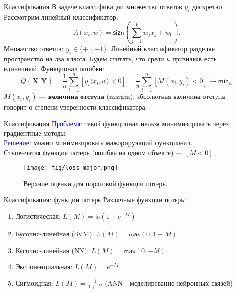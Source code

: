 \documentclass[handout]{beamer}
\begin{document}
\begin{frame}{Классификация}
	В задаче классификации множество ответов $y_i$ дискретно.\\
	Рассмотрим линейный классификатор: 
	\begin{equation}
		A(x_i,w)=\mathsf{sign}(\sum_{j=1}^kw_jx_j + w_0).
	\end{equation}
	Множество ответов: $y_i \in \{+1, -1\}$. Линейный классификатор разделяет пространство на два класса. Будем считать, что среди $k$ признаков есть единичный.
	Функционал ошибки:
	\begin{equation}
		Q(\mathbf{X}, \mathbf{Y}) = \frac{1}{n}\sum_{i=1}^{n}[y_i\langle x_i, w\rangle < 0]=\frac{1}{n}\sum_{i=1}^{n}[M(x_i, y_i) < 0] \rightarrow \mathsf{min}_{w}
	\end{equation}
	$M(x_i, y_i)$ --- \textbf{величина отступа} (margin), абсолютная величина отступа говорит о степени уверенности классификатора. 
\end{frame}

\begin{frame}{Классификация}
	\small
	\textcolor{blue}{Проблема}: такой функционал нельзя минимизировать через градиентные методы.\\
	\textcolor{blue}{Решение}: можно минимизировать мажорирующий функционал.\\
	Ступенчатая функция потерь (ошибка на одном объекте) --- $[M < 0]$.
	\begin{figure}
	    \texttt{[image: fig/loss\_major.png]}
	    \caption{\small Верхние оценки для пороговой функции потерь.
	    } 
	    \label{fig:w_series}
	\end{figure}

\end{frame}

\begin{frame}{Классификация: функции потерь}
	Различные функции потерь:
	\vspace*{5pt}
	\begin{enumerate}
		\item Логистическая: $L(M) = \mathsf{ln}(1+e^{-M})$
		\vspace*{5pt}
		\item Кусочно-линейная (SVM): $L(M) = \mathsf{max}(0, 1-M)$
\vspace*{5pt}
		\item  Кусочно-линейная (NN): $L(M) = \mathsf{max}(0, -M)$
\vspace*{5pt}
		\item Экспоненциальная: $L(M) = e^{-M}$
\vspace*{5pt}
		\item Сигмоидная: $L(M) = \frac{1}{1+e^M}$ (ANN - моделирование нейронных связей)
	\end{enumerate}
\end{frame}
\end{document}
